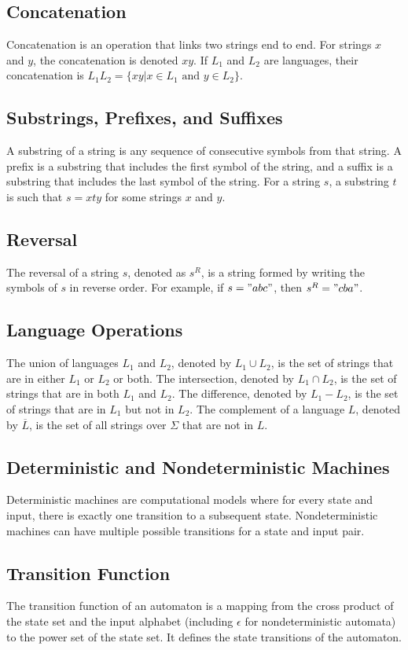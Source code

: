 \documentclass{article}
\begin{document}
\subsection{Concatenation}
Concatenation is an operation that links two strings end to end. For strings
$x$ and $y$, the concatenation is denoted $xy$. If $L_1$ and $L_2$ are
languages, their concatenation is $L_1L_2 = \{xy | x \in L_1 \text{ and } y \in
L_2\}$.

\subsection{Substrings, Prefixes, and Suffixes}
A substring of a string is any sequence of consecutive symbols from that
string. A prefix is a substring that includes the first symbol of the string,
and a suffix is a substring that includes the last symbol of the string. For a
string $s$, a substring $t$ is such that $s = xty$ for some strings $x$ and
$y$.

\subsection{Reversal}
The reversal of a string $s$, denoted as $s^R$, is a string formed by writing
the symbols of $s$ in reverse order. For example, if $s = "abc"$, then $s^R =
"cba"$.


\subsection{Language Operations}
The union of languages $L_1$ and $L_2$, denoted by $L_1 \cup L_2$, is the set
of strings that are in either $L_1$ or $L_2$ or both. The intersection, denoted
by $L_1 \cap L_2$, is the set of strings that are in both $L_1$ and $L_2$. The
difference, denoted by $L_1 - L_2$, is the set of strings that are in $L_1$ but
not in $L_2$. The complement of a language $L$, denoted by $\overline{L}$, is
the set of all strings over $\Sigma$ that are not in $L$.

\subsection{Deterministic and Nondeterministic Machines}
Deterministic machines are computational models where for every state and
input, there is exactly one transition to a subsequent state. Nondeterministic
machines can have multiple possible transitions for a state and input pair.

\subsection{Transition Function}
The transition function of an automaton is a mapping from the cross product of
the state set and the input alphabet (including $\epsilon$ for nondeterministic
automata) to the power set of the state set. It defines the state transitions
of the automaton.
\end{document}
